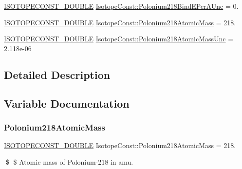 \begin{DoxyCompactItemize}
\mbox{\hyperlink{group___isotope_const-_macros_ga8f45a7272ce02c0b4c65c44636ed719a}{I\+S\+O\+T\+O\+P\+E\+C\+O\+N\+S\+T\+\_\+\+D\+O\+U\+B\+LE}} \mbox{\hyperlink{group___isotope_const-_polonium-_po218_ga00427973394696e5e7da3b5371825137}{Isotope\+Const\+::\+Polonium218\+Bind\+E\+Per\+A\+Unc}} = 0.
\item 
\mbox{\hyperlink{group___isotope_const-_macros_ga8f45a7272ce02c0b4c65c44636ed719a}{I\+S\+O\+T\+O\+P\+E\+C\+O\+N\+S\+T\+\_\+\+D\+O\+U\+B\+LE}} \mbox{\hyperlink{group___isotope_const-_polonium-_po218_ga59d7f12343fe549d0a9343a918f11291}{Isotope\+Const\+::\+Polonium218\+Atomic\+Mass}} = 218.
\item 
\mbox{\hyperlink{group___isotope_const-_macros_ga8f45a7272ce02c0b4c65c44636ed719a}{I\+S\+O\+T\+O\+P\+E\+C\+O\+N\+S\+T\+\_\+\+D\+O\+U\+B\+LE}} \mbox{\hyperlink{group___isotope_const-_polonium-_po218_gaf42ed53abe087648bc4528a097bcd300}{Isotope\+Const\+::\+Polonium218\+Atomic\+Mass\+Unc}} = 2.\+118e-\/06
\end{DoxyCompactItemize}


\subsection{Detailed Description}


\subsection{Variable Documentation}
\mbox{\label{group___isotope_const-_polonium-_po218_ga59d7f12343fe549d0a9343a918f11291}} 
\subsubsection{\texorpdfstring{Polonium218\+Atomic\+Mass}{Polonium218AtomicMass}}
{\footnotesize\ttfamily \mbox{\hyperlink{group___isotope_const-_macros_ga8f45a7272ce02c0b4c65c44636ed719a}{I\+S\+O\+T\+O\+P\+E\+C\+O\+N\+S\+T\+\_\+\+D\+O\+U\+B\+LE}} Isotope\+Const\+::\+Polonium218\+Atomic\+Mass = 218.}

\$ \$ Atomic mass of Polonium-\/218 in amu. \mbox{\label{group___isotope_const-_polonium-_po218_gaf42ed53abe087648bc4528a097bcd300}} 
